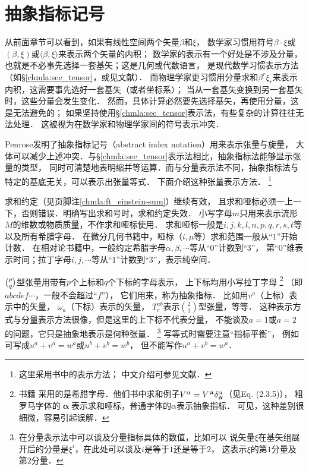 \section{抽象指标记号}\label{chmla:sec_abstract-index-notation}
从前面章节可以看到，如果有线性空间两个矢量$\beta$和$\xi$，
数学家习惯用符号$\beta\cdot\xi$或$(\beta,\xi)$或$\langle \beta,\xi \rangle$来表示两个矢量的内积；
数学家的表示有一个好处是不涉及分量，也就是不必事先选择一套基矢；这是几何或代数语言，
是现代数学习惯表示方法（如\S \ref{chmla:sec_tensor}，或见文献\parencite{cc2001-zh}）．
而物理学家更习惯用分量求和$\beta^r \xi_r$来表示内积，这需要事先选好一套基矢（或者坐标系）；
当从一套基矢变换到另一套基矢时，这些分量会发生变化．
然而，具体计算必然要先选择基矢，再使用分量，这是无法避免的；
如果坚持使用\S \ref{chmla:sec_tensor}表示法，有些复杂的计算往往无法处理．
这被视为在数学家和物理学家间的符号表示冲突．


Penrose\cite[Ch. 2]{penrose-Rindler1984}发明了抽象指标记号（abstract index notation）用来表示张量与旋量，
大体可以减少上述冲突．与\S \ref{chmla:sec_tensor}表示法相比，抽象指标法能够显示张量的类型，
同时可清楚地表明缩并等运算．而与分量表示法不同，抽象指标法与特定的基底无关，可以表示出张量等式．
下面介绍这种张量表示方法．
{\footnote{这里采用\textcite[\S 2.4, \S 3.4b]{wald1984}书中的表示方法；
		中文介绍可参见文献\parencite[\S 2.6]{liang_zhou2006_1}．}}

 求和约定（见\pageref{chmla:ft_einstein-sum}页脚注\ref{chmla:ft_einstein-sum}）继续有效，
且求和哑标必须一上一下，否则错误．明确写出求和号时，求和约定失效．
小写字母$m$只用来表示流形$M$的维数或物质质量，不作求和哑标使用．
求和哑标一般是$i,j,k,l,n,p,q,r,s,t$等以及所有希腊字母．
在微分几何书籍中，哑标（$i,\mu$等）求和范围一般从“$1$”开始计数．
在相对论书籍中，一般约定希腊字母$\alpha,\beta,\cdots$等从“$0$”计数到“$3$”，
第“$0$”维表示时间；拉丁字母$i,j,\cdots $等从“$1$”计数到“$3$”，表示纯空间．


 $\binom{p}{q}$型张量用带有$p$个上标和$q$个下标的字母表示，
上下标均用小写拉丁字母
{\footnote{\textcite[Ch. 2]{penrose-Rindler1984}书籍
        采用的是希腊字母．他们书中求和例子$V^\alpha=V^{\boldsymbol{\upalpha}}
        \delta_{\rm \boldsymbol{\upalpha}}^\alpha$（见Eq. (2.3.5)），
        粗罗马字体的${\boldsymbol{\upalpha}}$表示求和哑标，普通字体的$\alpha$表示抽象指标．
    可见，这种差别很细微，容易引起误解．}}
（即$abcdef\cdots$，一般不会超过“$f$”），
它们用来，称为抽象指标．
比如用$v^a$（上标）表示中的矢量，
$\omega_a$（下标）表示的矢量，
$T_{c}^{ab}$表示$\binom{2}{1}$型张量，等等．
这种表示方式与分量表示方法很像，但是这里的上下标不代表分量，
不能谈及$a=1$或$a=2$的问题，它只是{\kaishu 抽象}地表示是何种张量．
{\footnote{在分量表示法中可以谈及分量指标具体的数值，比如可以
        说矢量$\xi$在基矢组展开后的分量是$\xi ^i$，在此处可以谈及$i$是等于$1$还是等于$2$，
        这表示$\xi$的第$1$分量及第$2$分量．}}
写等式时需要注意“指标平衡”，
例如可写成$u^a + v^a = w^a$或$u^b + v^b = w^b$，
但不能写作$u^a + v^b = w^a$．


